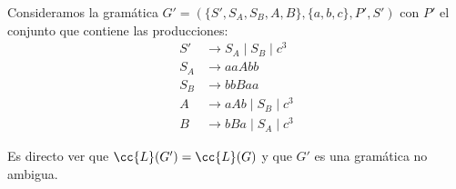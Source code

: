 \documentclass[12pt]{article}
\begin{document}
\begin{ejercicio}
\begin{enumerate}
        Consideramos la gramática $G'=(\{S', S_A, S_B, A, B\},\{a,b,c\},P',S')$ con $P'$ el conjunto que contiene las producciones:
        \begin{equation*}
            \begin{aligned}
                S' &\to S_A\mid S_B\mid c^3\\
                S_A &\to aaAbb\\
                S_B &\to bbBaa\\
                A &\to aAb \mid S_B\mid c^3\\
                B &\to bBa \mid S_A\mid c^3
            \end{aligned}
        \end{equation*}

        Es directo ver que $\cc{L}(G')=\cc{L}(G)$ y que $G'$ es una gramática no ambigua.
    \end{enumerate}
\end{ejercicio}
\end{document}
